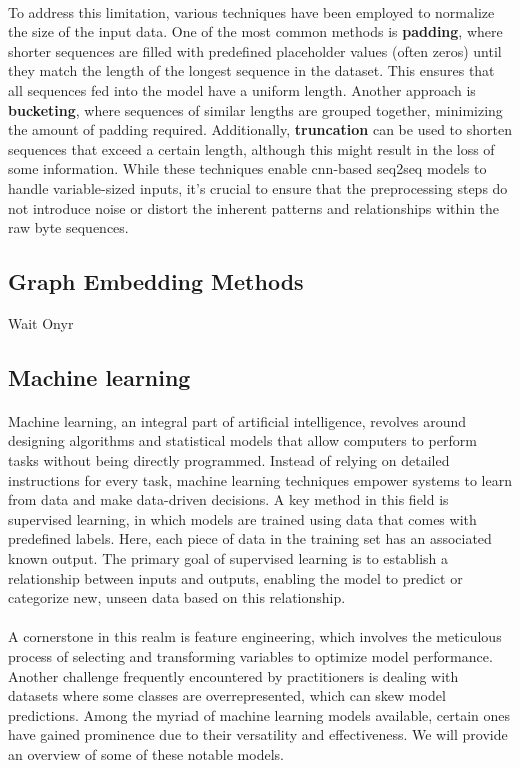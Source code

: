         \paragraph{}To address this limitation, various techniques have been employed to normalize the size of the input data. One of the most common methods is \textbf{padding}, where shorter sequences are filled with predefined placeholder values (often zeros) until they match the length of the longest sequence in the dataset. This ensures that all sequences fed into the model have a uniform length. Another approach is \textbf{bucketing}, where sequences of similar lengths are grouped together, minimizing the amount of padding required. Additionally, \textbf{truncation} can be used to shorten sequences that exceed a certain length, although this might result in the loss of some information. While these techniques enable \acrshort{cnn}-based \acrfull{seq2seq} models to handle variable-sized inputs, it's crucial to ensure that the preprocessing steps do not introduce noise or distort the inherent patterns and relationships within the raw byte sequences.
\subsection{Graph Embedding Methods}
    Wait Onyr

\subsection{Machine learning}
    \paragraph{}Machine learning, an integral part of artificial intelligence, revolves around designing algorithms and statistical models that allow computers to perform tasks without being directly programmed. Instead of relying on detailed instructions for every task, machine learning techniques empower systems to learn from data and make data-driven decisions. A key method in this field is supervised learning, in which models are trained using data that comes with predefined labels. Here, each piece of data in the training set has an associated known output. The primary goal of supervised learning is to establish a relationship between inputs and outputs, enabling the model to predict or categorize new, unseen data based on this relationship.

    \paragraph{}A cornerstone in this realm is feature engineering, which involves the meticulous process of selecting and transforming variables to optimize model performance. Another challenge frequently encountered by practitioners is dealing with datasets where some classes are overrepresented, which can skew model predictions. Among the myriad of machine learning models available, certain ones have gained prominence due to their versatility and effectiveness. We will provide an overview of some of these notable models.

